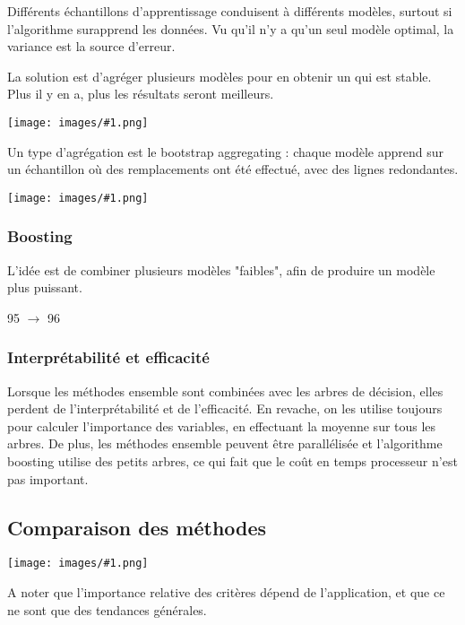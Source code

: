 \documentclass[10pt,a4paper]{report}
\newcommand{\dessin}[1]{\begin{center}\texttt{[image: images/\#1.png]}\end{center}}
\begin{document}
			Différents échantillons d'apprentissage conduisent à différents modèles, surtout si l'algorithme surapprend les données. Vu qu'il n'y a qu'un seul modèle optimal, la variance est la source d'erreur.
			
			La solution est d'agréger plusieurs modèles pour en obtenir un qui est stable. Plus il y en a, plus les résultats seront meilleurs.
			
			\dessin{21}
			
			Un type d'agrégation est le bootstrap aggregating : chaque modèle apprend sur un échantillon où des remplacements ont été effectué, avec des lignes redondantes.
			
			\dessin{22}
			
			
			\subsubsection{Boosting}
			
			L'idée est de combiner plusieurs modèles "faibles", afin de produire un modèle plus puissant.
			
			95 $\rightarrow$ 96
			
			\subsubsection{Interprétabilité et efficacité}
			
			Lorsque les méthodes ensemble sont combinées avec les arbres de décision, elles perdent de l'interprétabilité et de l'efficacité. En revache, on les utilise toujours pour calculer l'importance des variables, en effectuant la moyenne sur tous les arbres. De plus, les méthodes ensemble peuvent être parallélisée et l'algorithme boosting utilise des petits arbres, ce qui fait que le coût en temps processeur n'est pas important.
			
			\subsection{Comparaison des méthodes}
			
			\dessin{23}

			A noter que l'importance relative des critères dépend de l'application, et que ce ne sont que des tendances générales.
			
			
			
\end{document}
